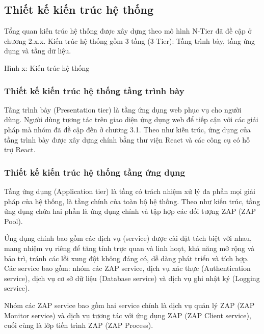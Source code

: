 \subsection{Thiết kế kiến trúc hệ thống}

\tab Tổng quan kiến trúc hệ thống được xây dựng theo mô hình N-Tier đã đề cập ở chương 2.x.x.
Kiến trúc hệ thống gồm 3 tầng (3-Tier): Tầng trình bày, tầng ứng dụng và tầng dữ liệu.

Hình x: Kiến trúc hệ thống

\subsubsection{Thiết kế kiến trúc hệ thống tầng trình bày}

\tab Tầng trình bày (Presentation tier) là tầng ứng dụng web phục vụ cho người dùng.
Người dùng tương tác trên giao diện ứng dụng web để tiếp cận với các giải pháp mà nhóm đã đề cập đến ở chương 3.1.
Theo như kiến trúc, ứng dụng của tầng trình bày được xây dựng chính bằng thư viện React và các công cụ có hỗ trợ React.

\subsubsection{Thiết kế kiến trúc hệ thống tầng ứng dụng}

\tab Tầng ứng dụng (Application tier) là tầng có trách nhiệm xử lý đa phần mọi giải pháp của hệ thống, là tầng chính của toàn bộ hệ thống.
Theo như kiến trúc, tầng ứng dụng chứa hai phần là ứng dụng chính và tập hợp các đối tượng ZAP (ZAP Pool).
\par

Ứng dụng chính bao gồm các dịch vụ (service) được cài đặt tách biệt với nhau, mang nhiệm vụ riêng để tăng tính trực quan và linh hoạt, khả năng mở rộng và bảo trì, tránh các lỗi xung đột không đáng có, dễ dàng phát triển và tích hợp.
Các service bao gồm: nhóm các ZAP service, dịch vụ xác thực (Authentication service), dịch vụ cơ sở dữ liệu (Database service) và dịch vụ ghi nhật ký (Logging service).
\par

\tab \tab Nhóm các ZAP service bao gồm hai service chính là dịch vụ quản lý ZAP (ZAP Monitor service) và dịch vụ tương tác với ứng dụng ZAP (ZAP Client service), cuối cùng là lớp tiến trình ZAP (ZAP Process).

